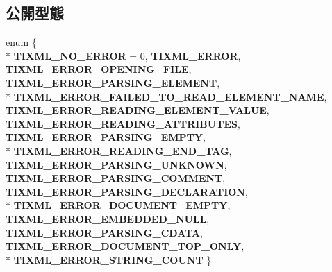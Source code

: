 \subsection*{公開型態}
\begin{DoxyCompactItemize}
\item 
enum \{ \\*
{\bfseries T\+I\+X\+M\+L\+\_\+\+N\+O\+\_\+\+E\+R\+R\+OR} = 0, 
{\bfseries T\+I\+X\+M\+L\+\_\+\+E\+R\+R\+OR}, 
{\bfseries T\+I\+X\+M\+L\+\_\+\+E\+R\+R\+O\+R\+\_\+\+O\+P\+E\+N\+I\+N\+G\+\_\+\+F\+I\+LE}, 
{\bfseries T\+I\+X\+M\+L\+\_\+\+E\+R\+R\+O\+R\+\_\+\+P\+A\+R\+S\+I\+N\+G\+\_\+\+E\+L\+E\+M\+E\+NT}, 
\\*
{\bfseries T\+I\+X\+M\+L\+\_\+\+E\+R\+R\+O\+R\+\_\+\+F\+A\+I\+L\+E\+D\+\_\+\+T\+O\+\_\+\+R\+E\+A\+D\+\_\+\+E\+L\+E\+M\+E\+N\+T\+\_\+\+N\+A\+ME}, 
{\bfseries T\+I\+X\+M\+L\+\_\+\+E\+R\+R\+O\+R\+\_\+\+R\+E\+A\+D\+I\+N\+G\+\_\+\+E\+L\+E\+M\+E\+N\+T\+\_\+\+V\+A\+L\+UE}, 
{\bfseries T\+I\+X\+M\+L\+\_\+\+E\+R\+R\+O\+R\+\_\+\+R\+E\+A\+D\+I\+N\+G\+\_\+\+A\+T\+T\+R\+I\+B\+U\+T\+ES}, 
{\bfseries T\+I\+X\+M\+L\+\_\+\+E\+R\+R\+O\+R\+\_\+\+P\+A\+R\+S\+I\+N\+G\+\_\+\+E\+M\+P\+TY}, 
\\*
{\bfseries T\+I\+X\+M\+L\+\_\+\+E\+R\+R\+O\+R\+\_\+\+R\+E\+A\+D\+I\+N\+G\+\_\+\+E\+N\+D\+\_\+\+T\+AG}, 
{\bfseries T\+I\+X\+M\+L\+\_\+\+E\+R\+R\+O\+R\+\_\+\+P\+A\+R\+S\+I\+N\+G\+\_\+\+U\+N\+K\+N\+O\+WN}, 
{\bfseries T\+I\+X\+M\+L\+\_\+\+E\+R\+R\+O\+R\+\_\+\+P\+A\+R\+S\+I\+N\+G\+\_\+\+C\+O\+M\+M\+E\+NT}, 
{\bfseries T\+I\+X\+M\+L\+\_\+\+E\+R\+R\+O\+R\+\_\+\+P\+A\+R\+S\+I\+N\+G\+\_\+\+D\+E\+C\+L\+A\+R\+A\+T\+I\+ON}, 
\\*
{\bfseries T\+I\+X\+M\+L\+\_\+\+E\+R\+R\+O\+R\+\_\+\+D\+O\+C\+U\+M\+E\+N\+T\+\_\+\+E\+M\+P\+TY}, 
{\bfseries T\+I\+X\+M\+L\+\_\+\+E\+R\+R\+O\+R\+\_\+\+E\+M\+B\+E\+D\+D\+E\+D\+\_\+\+N\+U\+LL}, 
{\bfseries T\+I\+X\+M\+L\+\_\+\+E\+R\+R\+O\+R\+\_\+\+P\+A\+R\+S\+I\+N\+G\+\_\+\+C\+D\+A\+TA}, 
{\bfseries T\+I\+X\+M\+L\+\_\+\+E\+R\+R\+O\+R\+\_\+\+D\+O\+C\+U\+M\+E\+N\+T\+\_\+\+T\+O\+P\+\_\+\+O\+N\+LY}, 
\\*
{\bfseries T\+I\+X\+M\+L\+\_\+\+E\+R\+R\+O\+R\+\_\+\+S\+T\+R\+I\+N\+G\+\_\+\+C\+O\+U\+NT}
 \}\hypertarget{class_ti_xml_base_ae5e65e2154f7a221619b0a73c502b38f}{}\label{class_ti_xml_base_ae5e65e2154f7a221619b0a73c502b38f}

\end{DoxyCompactItemize}
